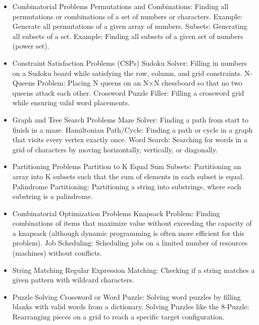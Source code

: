 \documentclass[a4paper,11pt,twoside]{book}
\begin{document}
\begin{itemize}
	\item Combinatorial Problems
Permutations and Combinations: Finding all permutations or combinations of a set of numbers or characters.
Example: Generate all permutations of a given array of numbers.
Subsets: Generating all subsets of a set.
Example: Finding all subsets of a given set of numbers (power set).

	\item  Constraint Satisfaction Problems (CSPs)
Sudoku Solver: Filling in numbers on a Sudoku board while satisfying the row, column, and grid constraints.
N-Queens Problem: Placing N queens on an N×N chessboard so that no two queens attack each other.
Crossword Puzzle Filler: Filling a crossword grid while ensuring valid word placements.

	\item Graph and Tree Search Problems
Maze Solver: Finding a path from start to finish in a maze.
Hamiltonian Path/Cycle: Finding a path or cycle in a graph that visits every vertex exactly once.
Word Search: Searching for words in a grid of characters by moving horizontally, vertically, or diagonally.

	\item  Partitioning Problems
Partition to K Equal Sum Subsets: Partitioning an array into K subsets such that the sum of elements in each subset is equal.
Palindrome Partitioning: Partitioning a string into substrings, where each substring is a palindrome.

	\item  Combinatorial Optimization Problems
Knapsack Problem: Finding combinations of items that maximize value without exceeding the capacity of a knapsack (although dynamic programming is often more efficient for this problem).
Job Scheduling: Scheduling jobs on a limited number of resources (machines) without conflicts.

	\item String Matching
Regular Expression Matching: Checking if a string matches a given pattern with wildcard characters.

	\item  Puzzle Solving
Crossword or Word Puzzle: Solving word puzzles by filling blanks with valid words from a dictionary.
Solving Puzzles like the 8-Puzzle: Rearranging pieces on a grid to reach a specific target configuration.

\end{itemize}
\end{document}
